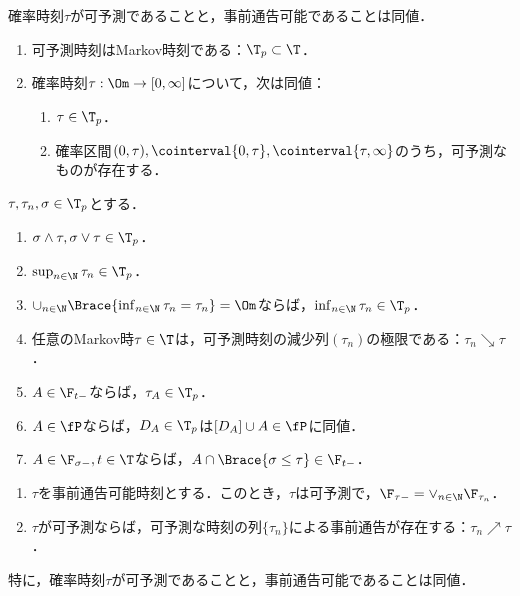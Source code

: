 \documentclass[uplatex,dvipdfmx]{jsreport}
\begin{document}
\begin{tcolorbox}[colframe=ForestGreen, colback=ForestGreen!10!white,breakable,colbacktitle=ForestGreen!40!white,coltitle=black,fonttitle=\bfseries\sffamily,
title=]
    確率時刻$\tau$が可予測であることと，事前通告可能であることは同値．
\end{tcolorbox}

\begin{proposition}[可予測時刻の特徴付け]\mbox{}
    \begin{enumerate}
        \item 可予測時刻はMarkov時刻である：$\T_p\subset\T$．
        \item 確率時刻$\tau:\Om\to[0,\infty]$について，次は同値：
        \begin{enumerate}
            \item $\tau\in\T_p$．
            \item 確率区間$(0,\tau),\cointerval{0,\tau},\cointerval{\tau,\infty}$のうち，可予測なものが存在する．
        \end{enumerate}
    \end{enumerate}
\end{proposition}

\begin{theorem}[可予測時刻の性質]
    $\tau,\tau_n,\sigma\in\T_p$とする．
    \begin{enumerate}
        \item $\sigma\land\tau,\sigma\lor\tau\in\T_p$．
        \item $\sup_{n\in\N}\tau_n\in\T_p$．
        \item $\cup_{n\in\N}\Brace{\inf_{n\in\N}\tau_n=\tau_n}=\Om$ならば，$\inf_{n\in\N}\tau_n\in\T_p$．
        \item 任意のMarkov時$\tau\in\T$は，可予測時刻の減少列$(\tau_n)$の極限である：$\tau_n\searrow\tau$．
        \item $A\in\F_{t-}$ならば，$\tau_A\in\T_p$．
        \item $A\in\fP$ならば，$D_A\in\T_p$は$[D_A]\cup A\in\fP$に同値．
        \item $A\in\F_{\sigma-},t\in\T$ならば，$A\cap\Brace{\sigma\le\tau}\in\F_{t-}$．
    \end{enumerate}
\end{theorem}

\begin{theorem}[事前通告可能時刻と可予測時刻は同値]\mbox{}
    \begin{enumerate}
        \item $\tau$を事前通告可能時刻とする．このとき，$\tau$は可予測で，$\F_{\tau-}=\lor_{n\in\N}\F_{\tau_n}$．
        \item $\tau$が可予測ならば，可予測な時刻の列$\{\tau_n\}$による事前通告が存在する：$\tau_n\nearrow\tau$．
    \end{enumerate}
    特に，確率時刻$\tau$が可予測であることと，事前通告可能であることは同値．
\end{theorem}
\end{document}
